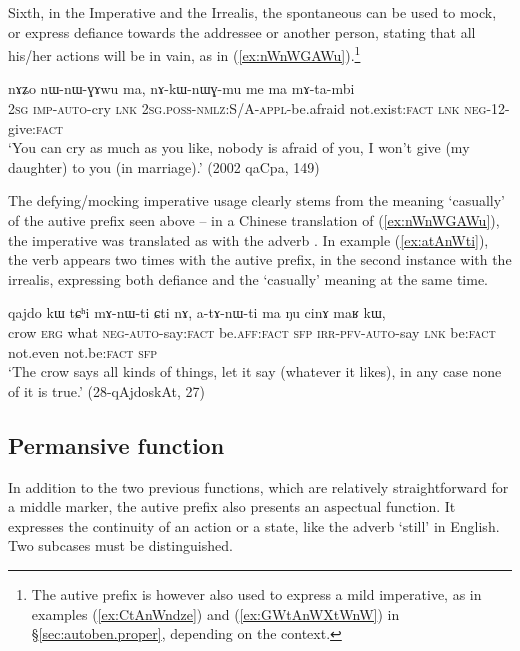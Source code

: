 Sixth, in the Imperative and the Irrealis, the spontaneous can be used to mock, or express defiance towards the addressee or another person, stating that all his/her actions will be in vain, as in (\ref{ex:nWnWGAWu}).\footnote{The autive prefix is however also used to express a mild imperative, as in examples (\ref{ex:CtAnWndze}) and (\ref{ex:GWtAnWXtWnW}) in §\ref{sec:autoben.proper}, depending on the context. }

\begin{exe}
\ex \label{ex:nWnWGAWu}
\gll  nɤʑo nɯ-nɯ-ɣɤwu ma, nɤ-kɯ-nɯɣ-mu me ma mɤ-ta-mbi \\
\textsc{2sg} \textsc{imp}-\textsc{auto}-cry \textsc{lnk} \textsc{2sg}.\textsc{poss}-\textsc{nmlz}:S/A-\textsc{appl}-be.afraid not.exist:\textsc{fact} \textsc{lnk} \textsc{neg}-1\fl{}2-give:\textsc{fact} \\
\glt `You can cry as much as you like, nobody is afraid of you, I won't give (my daughter) to you (in marriage).' (2002 qaCpa, 149)
\end{exe}

The defying/mocking imperative usage clearly stems from the meaning `casually' of the autive prefix seen above -- in a Chinese translation of (\ref{ex:nWnWGAWu}), the imperative  was translated as  with the adverb . In example (\ref{ex:atAnWti}), the verb  appears two times with the autive prefix, in the second instance with the irrealis, expressing both defiance and the `casually' meaning at the same time.

\begin{exe}
\ex \label{ex:atAnWti}
\gll  qajdo kɯ tɕʰi mɤ-nɯ-ti ɕti nɤ, a-tɤ-nɯ-ti ma ŋu cinɤ maʁ kɯ, \\
crow \textsc{erg} what \textsc{neg}-\textsc{auto}-say:\textsc{fact} be.\textsc{aff}:\textsc{fact} \textsc{sfp} \textsc{irr}-\textsc{pfv}-\textsc{auto}-say \textsc{lnk} be:\textsc{fact} not.even not.be:\textsc{fact} \textsc{sfp} \\
\glt `The crow says all kinds of things, let it say (whatever it likes), in any case none of it is true.'  (28-qAjdoskAt, 27)
\end{exe}
 
\subsection{Permansive function}  \label{sec:autoben.permansive}
In addition to the two previous functions, which are relatively straightforward for a middle marker, the autive prefix also presents an aspectual function. It expresses the continuity of an action or a state, like the adverb `still' in English. Two subcases must be distinguished.

